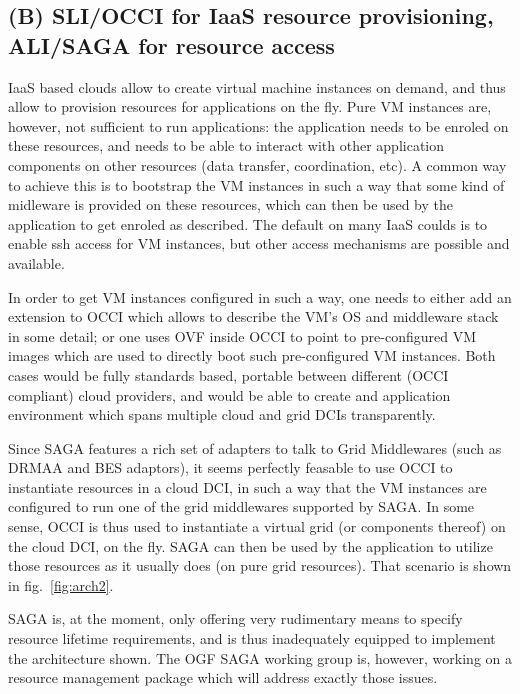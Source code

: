 \documentclass[10pt,conference,final,letterpaper,twoside,twocolumn,]{IEEEtran}
\begin{document}
 \subsection{(B) SLI/OCCI for IaaS resource provisioning, ALI/SAGA 
 for resource access}

 IaaS based clouds allow to create virtual machine instances on
 demand, and thus allow to provision resources for applications on the
 fly.  Pure VM instances are, however, not sufficient to run
 applications: the application needs to be enroled on these resources,
 and needs to be able to interact with other application components on
 other resources (data transfer, coordination, etc).  A common way to
 achieve this is to bootstrap the VM instances in such a way that some
 kind of midleware is provided on these resources, which can then be
 used by the application to get enroled as described.  The default on
 many IaaS coulds is to enable ssh access for VM instances, but other
 access mechanisms are possible and available.

 In order to get VM instances configured in such a way, one needs to
 either add an extension to OCCI which allows to describe the VM's OS
 and middleware stack in some detail; or one uses OVF inside OCCI to
 point to pre-configured VM images which are used to directly boot
 such pre-configured VM instances.  Both cases would be fully
 standards based, portable between different (OCCI compliant) cloud
 providers, and would be able to create and application environment
 which spans multiple cloud and grid DCIs transparently.
 
 Since SAGA features a rich set of adapters to talk to Grid
 Middlewares (such as DRMAA and BES adaptors), it seems perfectly
 feasable to use OCCI to instantiate resources in a cloud DCI, in such
 a way that the VM instances are configured to run one of the grid
 middlewares supported by SAGA.  In some sense, OCCI is thus used to
 instantiate a virtual grid (or components thereof) on the cloud DCI,
 on the fly.  SAGA can then be used by the application to utilize
 those resources as it usually does (on pure grid resources).  That
 scenario is shown in fig.~\ref{fig:arch2}.

 SAGA is, at the moment, only offering very rudimentary means to
 specify resource lifetime requirements, and is thus inadequately
 equipped to implement the architecture shown.  The OGF SAGA working
 group is, however, working on a resource management package which
 will address exactly those issues.
\end{document}
